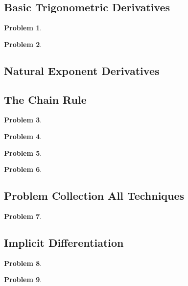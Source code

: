 \documentclass{article}
\newtheorem{problem}{Problem}
\begin{document}
\subsection{Basic Trigonometric Derivatives}\label{secMPStrigDerivatives}
\begin{problem}

\end{problem}
\begin{problem}

\end{problem}
\subsection{Natural Exponent Derivatives}


\subsection{The Chain Rule}\label{secMPSchainRule}

\begin{problem}

\end{problem}


\begin{problem}

\end{problem}


\begin{problem}

\end{problem}
\begin{problem}

\end{problem}
\subsection{Problem Collection All Techniques}
\begin{problem}

\end{problem}


\subsection{Implicit Differentiation}\label{secMPSImplicitDifferentiation}
\begin{problem}

\end{problem}
\begin{problem}

\end{problem}

\end{document}
